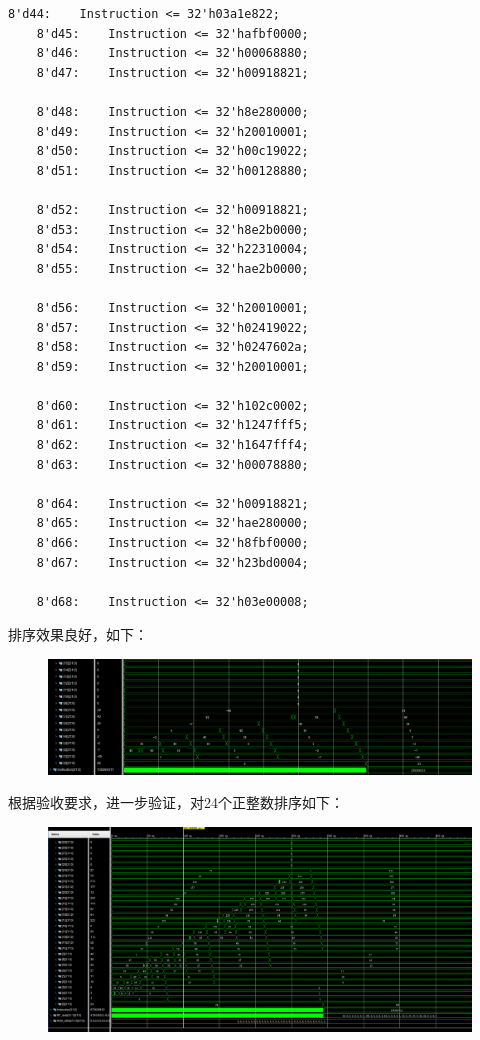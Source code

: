 \documentclass[10pt]{article}
\begin{document}
\begin{lstlisting}[style={verilog-style}]
    8'd44:    Instruction <= 32'h03a1e822;
    8'd45:    Instruction <= 32'hafbf0000;
    8'd46:    Instruction <= 32'h00068880;
    8'd47:    Instruction <= 32'h00918821;
    
    8'd48:    Instruction <= 32'h8e280000;
    8'd49:    Instruction <= 32'h20010001;
    8'd50:    Instruction <= 32'h00c19022;
    8'd51:    Instruction <= 32'h00128880;
    
    8'd52:    Instruction <= 32'h00918821;
    8'd53:    Instruction <= 32'h8e2b0000;
    8'd54:    Instruction <= 32'h22310004;
    8'd55:    Instruction <= 32'hae2b0000;
    
    8'd56:    Instruction <= 32'h20010001;
    8'd57:    Instruction <= 32'h02419022;
    8'd58:    Instruction <= 32'h0247602a;
    8'd59:    Instruction <= 32'h20010001;
    
    8'd60:    Instruction <= 32'h102c0002;
    8'd61:    Instruction <= 32'h1247fff5;
    8'd62:    Instruction <= 32'h1647fff4;
    8'd63:    Instruction <= 32'h00078880;
    
    8'd64:    Instruction <= 32'h00918821;
    8'd65:    Instruction <= 32'hae280000;
    8'd66:    Instruction <= 32'h8fbf0000;
    8'd67:    Instruction <= 32'h23bd0004;
    
    8'd68:    Instruction <= 32'h03e00008;
\end{lstlisting}

排序效果良好，如下：
\begin{figure}[H]
    \centering
    \includegraphics[scale=0.35]{sicy.png}
    \end{figure}
根据验收要求，进一步验证，对24个正整数排序如下：
\begin{figure}[H]
    \centering
    \includegraphics[scale=0.38]{MUCHOGUSTO.png}
    \end{figure}
\newpage
\end{document}
